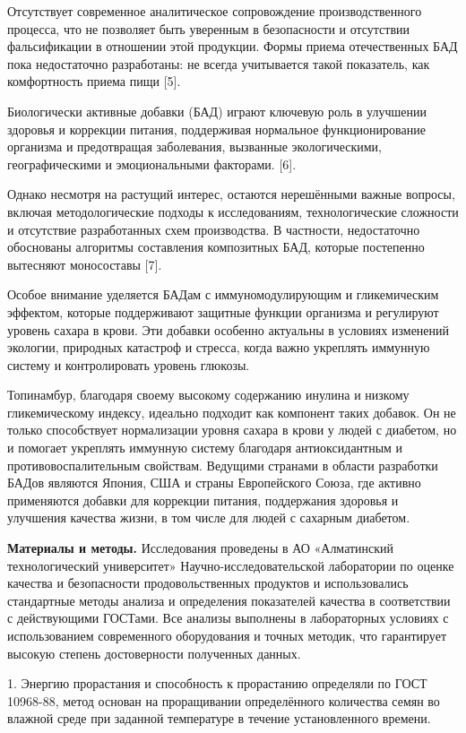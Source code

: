 \begin{multicols}{2}
Отсутствует современное аналитическое сопровождение производственного
процесса, что не позволяет быть уверенным в безопасности и отсутствии
фальсификации в отношении этой продукции. Формы приема отечественных БАД
пока недостаточно разработаны: не всегда учитывается такой показатель,
как комфортность приема пищи {[}5{]}.

Биологически активные добавки (БАД) играют ключевую роль в улучшении
здоровья и коррекции питания, поддерживая нормальное функционирование
организма и предотвращая заболевания, вызванные экологическими,
географическими и эмоциональными факторами. {[}6{]}.

Однако несмотря на растущий интерес, остаются нерешёнными важные
вопросы, включая методологические подходы к исследованиям,
технологические сложности и отсутствие разработанных схем производства.
В частности, недостаточно обоснованы алгоритмы составления композитных
БАД, которые постепенно вытесняют моносоставы {[}7{]}.

Особое внимание уделяется БАДам с иммуномодулирующим и гликемическим
эффектом, которые поддерживают защитные функции организма и регулируют
уровень сахара в крови. Эти добавки особенно актуальны в условиях
изменений экологии, природных катастроф и стресса, когда важно укреплять
иммунную систему и контролировать уровень глюкозы.

Топинамбур, благодаря своему высокому содержанию инулина и низкому
гликемическому индексу, идеально подходит как компонент таких добавок.
Он не только способствует нормализации уровня сахара в крови у людей с
диабетом, но и помогает укреплять иммунную систему благодаря
антиоксидантным и противовоспалительным свойствам. Ведущими странами в
области разработки БАДов являются Япония, США и страны Европейского
Союза, где активно применяются добавки для коррекции питания,
поддержания здоровья и улучшения качества жизни, в том числе для людей с
сахарным диабетом.

{\bfseries Материалы и методы.} Исследования проведены в АО «Алматинский
технологический университет» Научно-исследовательской лаборатории по
оценке качества и безопасности продовольственных продуктов и
использовались стандартные методы анализа и определения показателей
качества в соответствии с действующими ГОСТами. Все анализы выполнены в
лабораторных условиях с использованием современного оборудования и
точных методик, что гарантирует высокую степень достоверности полученных
данных.

1. Энергию прорастания и способность к прорастанию определяли по ГОСТ
10968-88, метод основан на проращивании определённого количества семян
во влажной среде при заданной температуре в течение установленного
времени.


\end{multicols}
